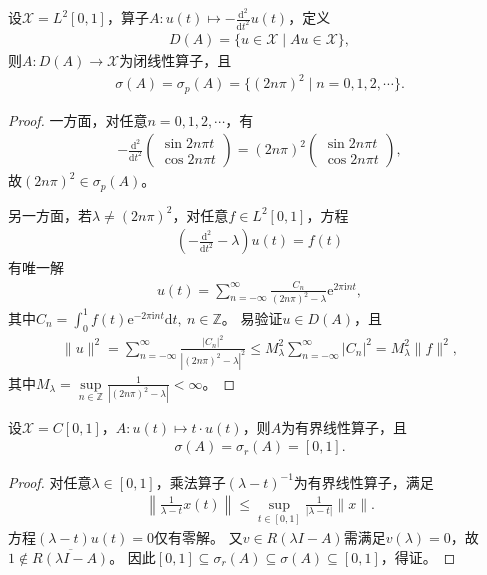 \documentclass[../../main.tex]{subfiles}%
\begin{document}
\begin{example}
设$\mathscr{X}=L^2[0,1]$，算子$A:u(t)\mapsto -\frac{\mathrm{d}^2}{\mathrm{d}t^2}u(t)$，定义
\begin{align*}
D(A)=\{u\in\mathscr{X}\mid Au\in\mathscr{X}\},
\end{align*}
则$A:D(A)\to\mathscr{X}$为闭线性算子，且
\begin{align*}
\sigma(A)=\sigma_p(A)=\{(2n\pi)^2\mid n=0,1,2,\cdots\}.
\end{align*}
\begin{proof}
一方面，对任意$n=0,1,2,\cdots$，有
\begin{align*}
-\frac{\mathrm{d}^2}{\mathrm{d}t^2}\begin{pmatrix}\sin2n\pi t\\\cos2n\pi t\end{pmatrix}=(2n\pi)^2\begin{pmatrix}\sin2n\pi t\\\cos2n\pi t\end{pmatrix},
\end{align*}
故$(2n\pi)^2\in\sigma_p(A)$。

另一方面，若$\lambda\neq(2n\pi)^2$，对任意$f\in L^2[0,1]$，方程
\begin{align*}
\left(-\frac{\mathrm{d}^2}{\mathrm{d}t^2}-\lambda\right)u(t)=f(t)
\end{align*}
有唯一解
\begin{align*}
u(t)=\sum\limits_{n=-\infty}^{\infty}\frac{C_n}{(2n\pi)^2-\lambda}\mathrm{e}^{2\pi\mathrm{i}nt},
\end{align*}
其中$C_n=\int_{0}^{1}f(t)\mathrm{e}^{-2\pi\mathrm{i}nt}\mathrm{d}t,\ n\in\mathbb{Z}$。
易验证$u\in D(A)$，且
\begin{align*}
\|u\|^2=\sum\limits_{n=-\infty}^{\infty}\frac{|C_n|^2}{|(2n\pi)^2-\lambda|^2}\leqslant M_{\lambda}^2\sum\limits_{n=-\infty}^{\infty}|C_n|^2=M_{\lambda}^2\|f\|^2,
\end{align*}
其中$M_{\lambda}=\sup\limits_{n\in\mathbb{Z}}\frac{1}{|(2n\pi)^2-\lambda|}<\infty$。
\end{proof}
\end{example}

\begin{example}
设$\mathscr{X}=C[0,1]$，$A:u(t)\mapsto t\cdot u(t)$，则$A$为有界线性算子，且
\begin{align*}
\sigma(A)=\sigma_r(A)=[0,1].
\end{align*}
\begin{proof}
对任意$\lambda\in[0,1]$，乘法算子$(\lambda-t)^{-1}$为有界线性算子，满足
\begin{align*}
\left\|\frac{1}{\lambda-t}x(t)\right\|\leqslant\sup\limits_{t\in[0,1]}\frac{1}{|\lambda-t|}\|x\|.
\end{align*}
方程$(\lambda-t)u(t)=0$仅有零解。
又$v\in R(\lambda I-A)$需满足$v(\lambda)=0$，故$1\notin\overline{R(\lambda I-A)}$。
因此$[0,1]\subseteq\sigma_r(A)\subseteq\sigma(A)\subseteq[0,1]$，得证。
\end{proof}
\end{example}
\end{document}
